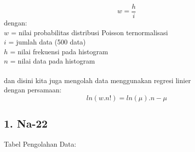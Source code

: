 \documentclass{article}
\begin{document}
		\begin{equation}
		w = \frac{h}{i}
		\end{equation}
		dengan:\\
		$w$ = nilai probabilitas distribusi Poisson ternormalisasi\\
		$i$ = jumlah data (500 data)\\
		$h$ = nilai frekuensi pada histogram\\
		$n$ = nilai data pada histogram\\ \\
		dan disini kita juga mengolah data menggunakan regresi linier\\
		dengan persamaan:
		\begin{equation}
		ln(w.n!) = ln(\mu).n-\mu
		\end{equation}
			
			\subsection*{1. Na-22}
			Tabel Pengolahan Data:
			
\end{document}
